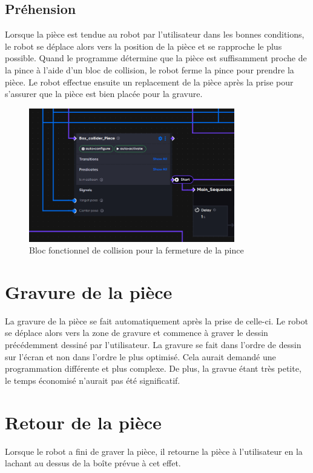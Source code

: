 \subsection{Préhension}

Lorsque la pièce est tendue au robot par l'utilisateur dans les bonnes conditions, le robot se déplace alors vers la position de la pièce et se rapproche le plus possible. Quand le programme détermine que la pièce est suffisamment proche de la pince à l'aide d'un bloc de collision, le robot ferme la pince pour prendre la pièce. Le robot effectue ensuite un replacement de la pièce après la prise pour s'assurer que la pièce est bien placée pour la gravure.

\begin{figure}[H]
    \centering
    \includegraphics[width=0.8\textwidth]{assets/figures/AICA_box_prise.png}
    \caption{Bloc fonctionnel de collision pour la fermeture de la pince}
    \label{fig:prise_piece}
\end{figure}

\section{Gravure de la pièce}

La gravure de la pièce se fait automatiquement après la prise de celle-ci. Le robot se déplace alors vers la zone de gravure et commence à graver le dessin précédemment dessiné par l'utilisateur.
La gravure se fait dans l'ordre de dessin sur l'écran et non dans l'ordre le plus optimisé. Cela aurait demandé une programmation différente et plus complexe. De plus, la gravue étant très petite, le temps économisé n'aurait pas été significatif.

\section{Retour de la pièce}

Lorsque le robot a fini de graver la pièce, il retourne la pièce à l'utilisateur en la lachant au dessus de la boîte prévue à cet effet.
